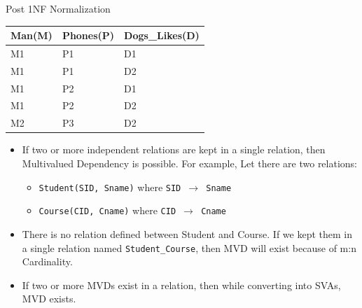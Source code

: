 \documentclass[aspectratio=169, xcolor=dvipsnames]{beamer}
\begin{document}
\begin{frame}{Post 1NF Normalization}
    \begin{table}
    \centering
    \begin{tabular}{lll}
    \toprule
    \textbf{Man(M)} & \textbf{Phones(P)} & \textbf{Dogs\_Likes(D)} \\
    \midrule
    M1 & P1 & D1 \\
    M1 & P1 & D2 \\
    M1 & P2 & D1 \\
    M1 & P2 & D2 \\
    M2 & P3 & D2 \\
    \bottomrule
    \end{tabular}
    \end{table}
    \begin{itemize}[<+->]
        \item If two or more independent relations are kept in a single relation, then Multivalued Dependency is possible. For example, Let there are two relations:
        \begin{itemize}
            \item[$\triangleright$] \texttt{Student(SID, Sname)} where \texttt{SID $\rightarrow$ Sname}
            \item[$\triangleright$] \texttt{Course(CID, Cname)} where \texttt{CID $\rightarrow$ Cname}
        \end{itemize}
        \item There is no relation defined between Student and Course. If we kept them in a single relation named \texttt{Student\_Course}, then MVD will exist because of m:n Cardinality.
        \item If two or more MVDs exist in a relation, then while converting into SVAs, MVD exists.
    \end{itemize}
\end{frame}
\end{document}
